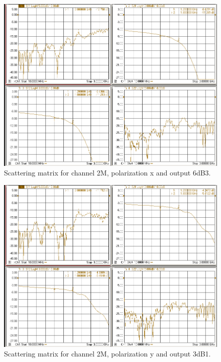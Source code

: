 \documentclass[12pt,a4paper,oneside]{article}
\begin{document}
\begin{figure}[H]
\centering
\includegraphics[width=0.9\linewidth]{VNA_results/2Mx_6dB3.png}
\caption{Scattering matrix for channel 2M, polarization x and output 6dB3.}
\label{fig:2Mx_6dB3}
\end{figure}


\begin{figure}[H]
\centering
\includegraphics[width=0.9\linewidth]{VNA_results/2My_3dB1.png}
\caption{Scattering matrix for channel 2M, polarization y and output 3dB1.}
\label{fig:2My_3dB1}
\end{figure}
\end{document}
